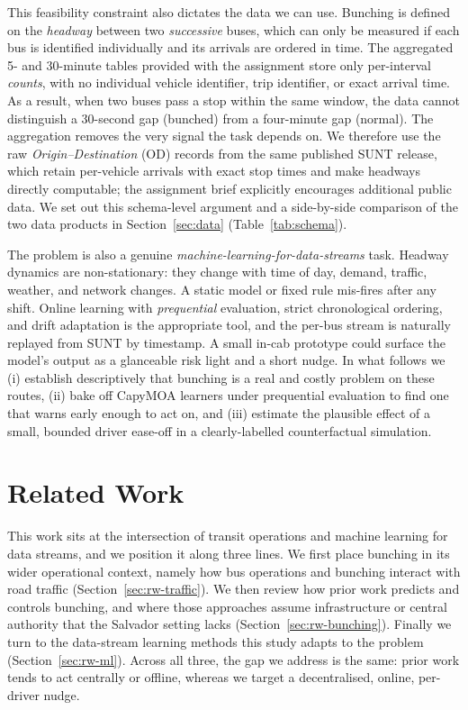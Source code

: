 \documentclass[final,5p,times,twocolumn,authoryear]{elsarticle}
\begin{document}
This feasibility constraint also dictates the data we can use. Bunching is defined on the
\emph{headway} between two \emph{successive} buses, which can only be measured if each bus is
identified individually and its arrivals are ordered in time. The aggregated 5- and 30-minute
tables provided with the assignment store only per-interval \emph{counts}, with no individual
vehicle identifier, trip identifier, or exact arrival time. As a result, when two buses pass a stop
within the same window, the data cannot distinguish a 30-second gap (bunched) from a four-minute gap
(normal). The aggregation removes the very signal the task depends on. We therefore use the raw
\emph{Origin--Destination} (OD) records from the same published SUNT release, which retain
per-vehicle arrivals with exact stop times and make headways directly computable; the assignment
brief explicitly encourages additional public data. We set out this schema-level argument and a
side-by-side comparison of the two data products in Section~\ref{sec:data} (Table~\ref{tab:schema}).

The problem is also a genuine \emph{machine-learning-for-data-streams} task. Headway dynamics
are non-stationary: they change with time of day, demand, traffic, weather, and network
changes. A static model or fixed rule mis-fires after any shift. Online learning with
\emph{prequential} evaluation, strict chronological ordering, and drift adaptation
\citep{Bifet2007} is the appropriate tool, and the per-bus stream is naturally replayed from
SUNT by timestamp. A small in-cab prototype could surface the model's output as a glanceable
risk light and a short nudge. In what follows we (i) establish descriptively that bunching is a
real and costly problem on these routes, (ii) bake off CapyMOA learners under prequential
evaluation to find one that warns early enough to act on, and (iii) estimate the plausible effect
of a small, bounded driver ease-off in a clearly-labelled counterfactual simulation.

\section{Related Work}
\label{sec:related}

This work sits at the intersection of transit operations and machine learning for data streams, and
we position it along three lines. We first place bunching in its wider operational context, namely how
bus operations and bunching interact with road traffic (Section~\ref{sec:rw-traffic}). We then review
how prior work predicts and controls bunching, and where those approaches assume infrastructure or
central authority that the Salvador setting lacks (Section~\ref{sec:rw-bunching}). Finally we turn to
the data-stream learning methods this study adapts to the problem (Section~\ref{sec:rw-ml}). Across
all three, the gap we address is the same: prior work tends to act centrally or offline, whereas we
target a decentralised, online, per-driver nudge.
\end{document}
